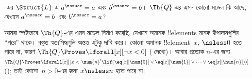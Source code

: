 \documentclass[../../../include/open-logic-section]{subfiles}
\begin{document}
\begin{prob}
-এর $\Struct{L}$-এ
$a^\nssucc=a$ এবং $b^\nssucc=b$। $\Th{Q}$-এর এমন কোনো মডেল কি আছে,
যেখানে $a^\nssucc=b$ এবং $b^\nssucc=a$?
\end{prob}

\begin{explain}
আমরা স্পষ্টভাবে $\Th{Q}$-এর এমন মডেল নির্মাণ করেছি, যেখানে অমানক
!!{element}s মানক উপাদানগুলির ``পরে'' থাকে। বস্তুত স্বতঃসিদ্ধগুলি
অন্তত এটুকু দাবি করে। কোনো অমানক !!{element}~$x$, ${} \nsless 0$ হতে
পারে না, কারণ $\Th{Q} \Proves \lforall[x][\lnot x<0]$
( দেখো)। আবার প্রত্যেক $n$-এর জন্য
$\Th{Q} \Proves \lforall[x][(x < \num{n}' \lif
(\eq[x][\num{0}] \lor \eq[x][\num{1}] \lor \dots \lor
\eq[x][\num{n}]))]$ (); তাই
কোনো~$n>0$-এর জন্য $x \nsless n$ হতে পারে না।
\end{explain}
\end{document}
